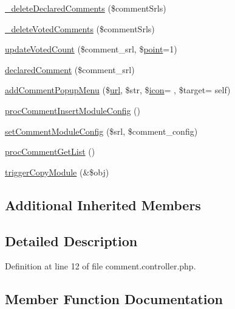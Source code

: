 \begin{DoxyCompactItemize}
\item 
\hyperlink{classcommentController_a06a2f96cd357550dd0cd834d7e61f4bf}{\+\_\+delete\+Declared\+Comments} (\$comment\+Srls)
\item 
\hyperlink{classcommentController_a0e4216451f3bb1c02aeec98bb4f54ddc}{\+\_\+delete\+Voted\+Comments} (\$comment\+Srls)
\item 
\hyperlink{classcommentController_abe720cae94b04ba356b00f80f6880e91}{update\+Voted\+Count} (\$comment\+\_\+srl, \$\hyperlink{classpoint}{point}=1)
\item 
\hyperlink{classcommentController_aaae1e5860a1e170a8fc3142f80bbcde6}{declared\+Comment} (\$comment\+\_\+srl)
\item 
\hyperlink{classcommentController_a27025d0f5cc53f58566493e6e33b924a}{add\+Comment\+Popup\+Menu} (\$\hyperlink{swfupload_8js_a440a52a9004fdab0700100a6ddb49f67}{url}, \$str, \$\hyperlink{config_8min_8js_a939508fb879a7e4dc00e07a67919400c}{icon}= \textquotesingle{}\textquotesingle{}, \$target= \textquotesingle{}self\textquotesingle{})
\item 
\hyperlink{classcommentController_ab4a71283244210be754cceb8511e8789}{proc\+Comment\+Insert\+Module\+Config} ()
\item 
\hyperlink{classcommentController_a3e4d45ad61f74541e1182c29924b625d}{set\+Comment\+Module\+Config} (\$srl, \$comment\+\_\+config)
\item 
\hyperlink{classcommentController_ac9edb9826c8b07ceb1a4db29c5db514a}{proc\+Comment\+Get\+List} ()
\item 
\hyperlink{classcommentController_a5cf1c177c5cbdd0556363a0204d92f5f}{trigger\+Copy\+Module} (\&\$obj)
\end{DoxyCompactItemize}
\subsection*{Additional Inherited Members}


\subsection{Detailed Description}


Definition at line 12 of file comment.\+controller.\+php.



\subsection{Member Function Documentation}
